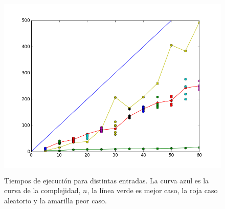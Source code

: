 \documentclass[10pt,a4paper]{article}
\begin{document}
\begin{figure}[h!]
  \centering
  \includegraphics[width=12cm, height=9cm]{GenkiTime}
  \caption{Tiempos de ejecución para distintas entradas. La curva azul es la curva de la complejidad, $n$, la línea verde es mejor caso, la roja caso aleatorio y la amarilla peor caso.}
\end{figure}

\newpage
\end{document}
